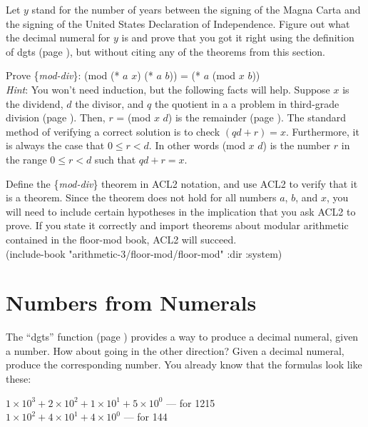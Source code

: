 \begin{ExerciseList}
\Exercise Let $y$ stand for the number of years
     between the signing of the Magna Carta and
     the signing of the United States Declaration of Independence.
     Figure out what the decimal numeral for $y$ is and
     prove that you got it right using
     the definition of dgts (page \pageref{dgts-defun}),
     but without citing any of the theorems from this section.

\Exercise \label{modular-division} Prove \{\emph{mod-div}\}:
(mod (* $a$ $x$) (* $a$ $b$)) = (* $a$ (mod $x$ $b$)) \\
\emph{Hint}: You won't need induction, but the following facts will help.
Suppose $x$ is the dividend, $d$ the divisor, and $q$ the quotient in a
a problem in third-grade division (page \pageref{third-grade-division}).
Then, $r$ = (mod $x$ $d$) is the remainder (page \pageref{mod-function}).
The standard method of verifying a correct solution is to
check $(qd + r) = x$. Furthermore, it is always the case
that $0 \le r < d$. In other words (mod $x$ $d$) is the number $r$
in the range $0 \le r < d$ such that $qd + r = x$.

\Exercise \label{mod-div-defthm} Define the \{\emph{mod-div}\} theorem
in ACL2 notation, and use ACL2 to verify that it is a theorem.
Since the theorem does not hold for all numbers $a$, $b$, and $x$,
you will need to include certain hypotheses in the implication
that you ask ACL2 to prove. If you state it correctly and import
theorems about modular arithmetic contained in the floor-mod book,
ACL2 will succeed.\\
\label{floor-mod-include-book}
\phantom{x}\hspace{2em}(include-book "arithmetic-3/floor-mod/floor-mod" :dir :system)
\end{ExerciseList}


\section{Numbers from Numerals}
\label{sec:numbers-from-numerals}
The ``dgts'' function (page \pageref{dgts-defun})
provides a way to produce a decimal
numeral, given a number. How about going in the other direction?
Given a decimal numeral, produce the corresponding number.
You already know that the formulas look like these:
\begin{samepage}
\begin{center}
$1 \times 10^3 + 2 \times 10^2 + 1 \times 10^1 + 5 \times 10^0$ --- for 1215 \\
$1 \times 10^2 + 4 \times 10^1 + 4 \times 10^0$ --- for 144
\end{center}
\end{samepage}

